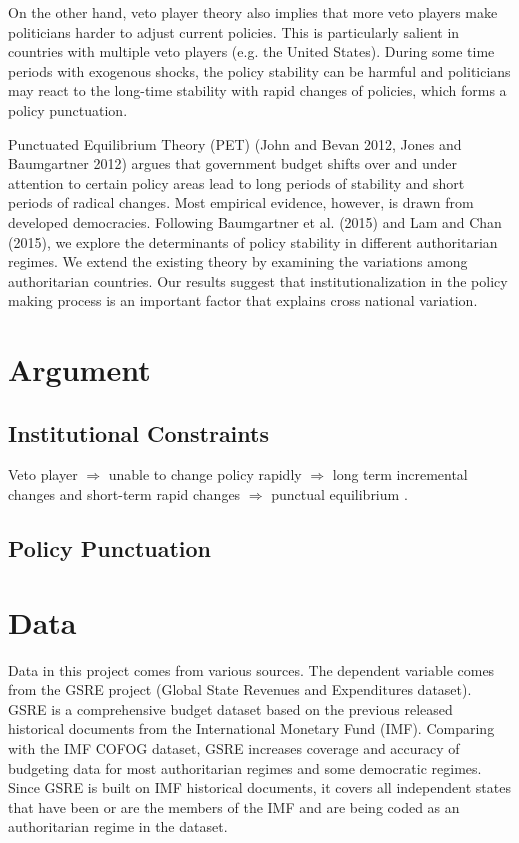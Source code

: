 \documentclass[12pt]{article}\usepackage[]{graphicx}\usepackage[]{color}
\begin{document}
On the other hand, veto player theory also implies that more veto players make politicians harder to adjust current policies. This is particularly salient in countries with multiple veto players (e.g. the United States). During some time periods with exogenous shocks, the policy stability can be harmful and politicians may react to the long-time stability with rapid changes of policies, which forms a policy punctuation. 


Punctuated Equilibrium Theory (PET) (John and Bevan 2012, Jones and Baumgartner 2012) argues that government budget shifts over and under attention to certain policy areas lead to long periods of stability and short periods of radical changes. Most empirical evidence, however, is drawn from developed democracies. Following Baumgartner et al. (2015) and Lam and Chan (2015), we explore the determinants of policy stability in different authoritarian regimes. We extend the existing theory by examining the variations among authoritarian countries. Our results suggest that institutionalization in the policy making process is an important factor that explains cross national variation.


\nocite{JohBevan2012} \nocite{JonesBaumgartner2012}
\nocite{TsebelisChang2004}
\nocite{LamChan2015}
\nocite{TsebelisChang2004}


\section{Argument} 

\subsection{Institutional Constraints}

Veto player $\Rightarrow$ unable to change policy rapidly $\Rightarrow$ long term incremental changes and short-term rapid changes $\Rightarrow$ punctual equilibrium \cite{DerekBaumgartner2016}. 








\subsection{Policy Punctuation}





\section{Data}
Data in this project comes from various sources. The dependent variable comes from the GSRE project (Global State Revenues and Expenditures dataset). GSRE is a comprehensive budget dataset based on the previous released historical documents from the International Monetary Fund (IMF). Comparing with the IMF COFOG dataset, GSRE increases coverage and accuracy of budgeting data for most authoritarian regimes and some democratic regimes. Since GSRE is built on IMF historical documents, it covers all independent states that have been or are the members of the IMF and are being coded as an authoritarian regime in the \cite{Geddesetal2014} dataset. 
\end{document}
